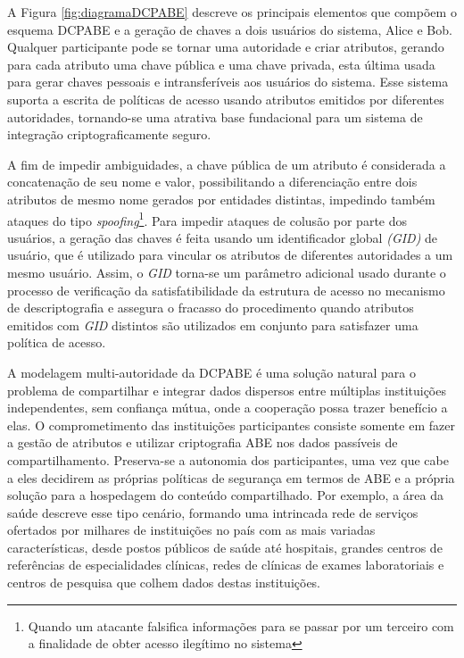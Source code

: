 \documentclass[a4paper,11pt]{article}
\begin{document}
A Figura \ref{fig:diagramaDCPABE} descreve os principais elementos que compõem o esquema DCPABE e a geração de chaves a dois usuários do sistema, Alice e Bob.
Qualquer participante pode se tornar uma autoridade e criar atributos, gerando para cada atributo uma chave pública e uma chave privada, esta última usada para gerar chaves pessoais e intransferíveis aos usuários do sistema.
Esse sistema suporta a escrita de políticas de acesso usando atributos emitidos por diferentes autoridades, tornando-se uma atrativa base fundacional para um sistema de integração criptograficamente seguro.

A fim de impedir ambiguidades, a chave pública de um atributo é considerada a concatenação de seu nome e valor, possibilitando a diferenciação entre dois atributos de mesmo nome gerados por entidades distintas, impedindo também ataques do tipo \emph{spoofing}\footnote{Quando um atacante falsifica informações para se passar por um terceiro com a finalidade de obter acesso ilegítimo no sistema}.
Para impedir ataques de colusão por parte dos usuários, a geração das chaves é feita usando um identificador global \emph{(GID)} de usuário, que é utilizado para vincular os atributos de diferentes autoridades a um mesmo usuário.
Assim, o \emph{GID} torna-se um parâmetro adicional usado durante o processo de verificação da satisfatibilidade da estrutura de acesso no mecanismo de descriptografia e assegura o fracasso do procedimento quando atributos emitidos com \emph{GID} distintos são utilizados em conjunto para satisfazer uma política de acesso.

A modelagem multi-autoridade da DCPABE é uma solução natural para o problema de compartilhar e integrar dados dispersos entre múltiplas instituições independentes, sem confiança mútua, onde a cooperação possa trazer benefício a elas.
O comprometimento das instituições participantes consiste somente em fazer a gestão de atributos e utilizar criptografia ABE nos dados passíveis de compartilhamento.
Preserva-se a autonomia dos participantes, uma vez que cabe a eles decidirem as próprias políticas de segurança em termos de ABE e a própria solução para a hospedagem do conteúdo compartilhado.
Por exemplo, a área da saúde descreve esse tipo cenário, formando uma intrincada rede de serviços ofertados por milhares de instituições no país com as mais variadas características, desde postos públicos de saúde até hospitais, grandes centros de referências de especialidades clínicas, redes de clínicas de exames laboratoriais e centros de pesquisa que colhem dados destas instituições.
\end{document}
